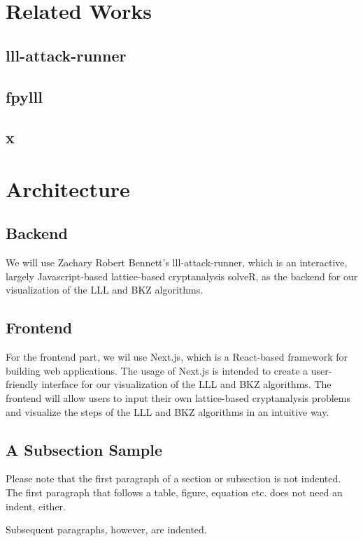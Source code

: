 \documentclass[runningheads]{llncs}
\begin{document}
\section{Related Works}

\subsection{lll-attack-runner}

\subsection{fpylll}

\subsection{x}

\section{Architecture}

\subsection{Backend}
We will use Zachary Robert Bennett's lll-attack-runner, which is an interactive, largely Javascript-based lattice-based cryptanalysis solveR, as the backend for our visualization of the LLL and BKZ algorithms.

\subsection{Frontend}
For the frontend part, we wil use Next.js, which is a React-based framework for building web applications. The usage of Next.js is intended to create a user-friendly interface for our visualization of the LLL and BKZ algorithms. The frontend will allow users to input their own lattice-based cryptanalysis problems and visualize the steps of the LLL and BKZ algorithms in an intuitive way.

\subsection{A Subsection Sample}
Please note that the first paragraph of a section or subsection is
not indented. The first paragraph that follows a table, figure,
equation etc. does not need an indent, either.

Subsequent paragraphs, however, are indented.
\end{document}
